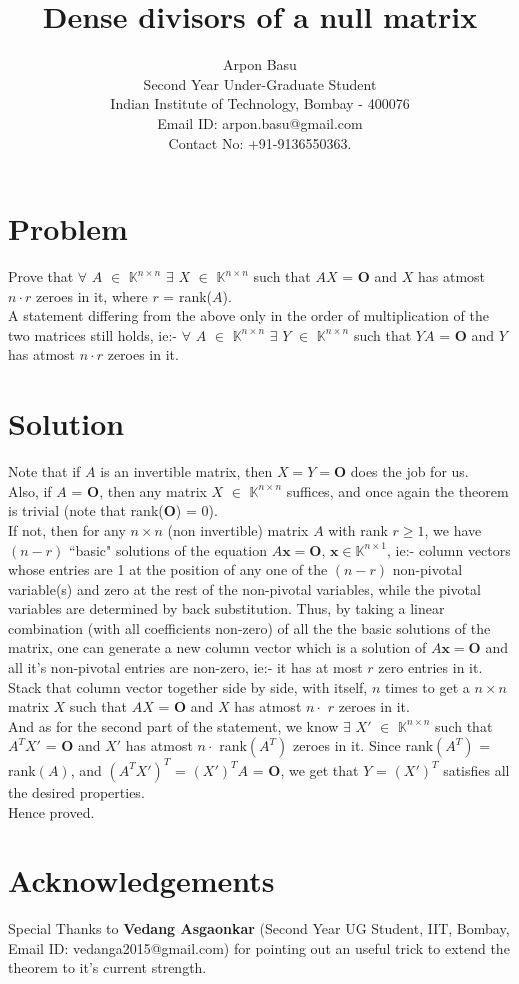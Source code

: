 \documentclass{article}
\title{\textbf{Dense divisors of a null matrix}}
\author{ Arpon Basu \\ Second Year Under-Graduate Student \\
Indian Institute of Technology, Bombay - 400076\\
    Email ID: arpon.basu@gmail.com \\
    Contact No: +91-9136550363.
}
\date{}
\begin{document}
\maketitle

\section{Problem}
Prove that $\forall$ $A$ $\in$ $\mathbb{K}^{n\times n}$ $\exists$ $X$ $\in$ $\mathbb{K}^{n\times n}$ such that $AX$ = $\textbf{O}$ and $X$ has atmost \\
$n\cdot r$ zeroes in it, where $r$ = rank($A$).\\
A statement differing from the above only in the order of multiplication of the two matrices still holds, ie:- $\forall$ $A$ $\in$ $\mathbb{K}^{n\times n}$ $\exists$ $Y$ $\in$ $\mathbb{K}^{n\times n}$ such that $YA$ = $\textbf{O}$ and $Y$ has atmost $n\cdot r$ zeroes in it. 

\section{Solution}
Note that if $A$ is an invertible matrix, then $X = Y = \textbf{O}$ does the job for us.\\
Also, if $A$ = $\textbf{O}$, then any matrix $X$ $\in$ $\mathbb{K}^{n\times n}$ suffices, and once again the theorem is trivial (note that rank($\textbf{O}$) = 0).\\
If not, then for any $n\times n$ (non invertible) matrix $A$ with rank $r \geq 1$, we have $(n - r)$ ``basic" solutions of the equation $A\textbf{x} = \textbf{O}$, $\textbf{x} \in \mathbb{K}^{n\times 1}$, ie:- column vectors whose entries are 1 at the position of any one of the $(n - r)$ non-pivotal variable(s) and zero at the rest of the non-pivotal variables, while the pivotal variables are determined by back substitution. Thus, by taking a linear combination (with all coefficients non-zero) of all the the basic solutions of the matrix, one can generate a new column vector which is a solution of $A\textbf{x} = \textbf{O}$ and all it's non-pivotal entries are non-zero, ie:- it has at most $r$ zero entries in it. Stack that column vector together side by side, with itself, $n$ times to get a $n\times n$ matrix $X$ such that $AX$ = $\textbf{O}$ and $X$ has atmost $n\cdot$ $r$ zeroes in it.\\
And as for the second part of the statement, we know $\exists$ $X'$ $\in$ $\mathbb{K}^{n\times n}$ such that $A^{T}X'$ = $\textbf{O}$ and $X'$ has atmost $n\cdot$ rank$(A^{T})$ zeroes in it. Since rank$(A^{T})$ = rank$(A)$, and $(A^{T}X')^{T}$ = $(X')^{T}A$ = $\textbf{O}$, we get that $Y$ = $(X')^{T}$ satisfies all the desired properties.\\
Hence proved.


\section{Acknowledgements}
Special Thanks to \textbf{Vedang Asgaonkar} (Second Year UG Student, IIT, Bombay, Email ID: vedanga2015@gmail.com) for pointing out an useful trick to extend the theorem to it's current strength.

















\end{document}
